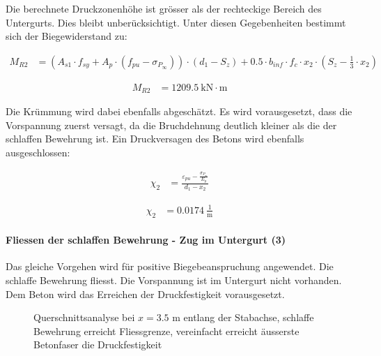 \documentclass[
  11pt,
  letterpaper,
]{scrreprt}
\let\oldparagraph\paragraph
\renewcommand{\paragraph}[1]{\oldparagraph{#1}\mbox{}}
\begin{document}
Die berechnete Druckzonenhöhe ist grösser als der rechteckige Bereich
des Untergurts. Dies bleibt unberücksichtigt. Unter diesen Gegebenheiten
bestimmt sich der Biegewiderstand zu:

$$
\begin{aligned}
M_{R2} &= \left( A_{s1} \cdot f_{sy} + A_{p} \cdot \left( f_{pu} - \sigma_{P_{\infty}} \right) \right) \cdot \left( d_{1} - S_{z} \right) + 0.5 \cdot b_{inf} \cdot f_{c} \cdot x_{2} \cdot \left( S_{z} - \frac{ 1 }{ 3 } \cdot x_{2} \right) \; 
\end{aligned}
$$

$$
\begin{aligned}
M_{R2} &= 1209.5\ \mathrm{kN} \cdot \mathrm{m} \;
\end{aligned}
$$

Die Krümmung wird dabei ebenfalls abgeschätzt. Es wird vorausgesetzt,
dass die Vorspannung zuerst versagt, da die Bruchdehnung deutlich
kleiner als die der schlaffen Bewehrung ist. Ein Druckversagen des
Betons wird ebenfalls ausgeschlossen:

$$
\begin{aligned}
\chi_{2} &= \frac{ \varepsilon_{pu} - \frac{ \sigma_{P_{\infty}} }{ E_{p} } }{ d_{1} - x_{2} } \; 
\end{aligned}
$$

$$
\begin{aligned}
\chi_{2} &= 0.0174\ \frac{1}{\mathrm{m}} \;
\end{aligned}
$$

\paragraph{Fliessen der schlaffen Bewehrung - Zug im Untergurt
(3)}\label{fliessen-der-schlaffen-bewehrung---zug-im-untergurt-3}

Das gleiche Vorgehen wird für positive Biegebeanspruchung angewendet.
Die schlaffe Bewehrung fliesst. Die Vorspannung ist im Untergurt nicht
vorhanden. Dem Beton wird das Erreichen der Druckfestigkeit
vorausgesetzt.

\begin{figure}[H]


\caption{\label{fig-t6_qs_MR_neg}Querschnittsanalyse bei \(x=3.5\) m
entlang der Stabachse, schlaffe Bewehrung erreicht Fliessgrenze,
vereinfacht erreicht äusserste Betonfaser die Druckfestigkeit}

\end{figure}%
\end{document}

